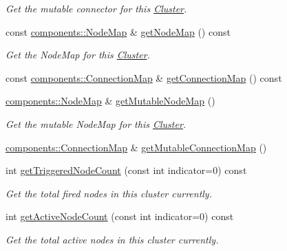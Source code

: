 \begin{DoxyCompactItemize}
\begin{DoxyCompactList}\small\item\em \-Get the mutable connector for this \hyperlink{classcryomesh_1_1structures_1_1Cluster}{\-Cluster}. \end{DoxyCompactList}\item 
const \hyperlink{classcryomesh_1_1components_1_1NodeMap}{components\-::\-Node\-Map} \& \hyperlink{classcryomesh_1_1structures_1_1Cluster_adebc5a93681278631cfb2d70fa579005}{get\-Node\-Map} () const 
\begin{DoxyCompactList}\small\item\em \-Get the \-Node\-Map for this \hyperlink{classcryomesh_1_1structures_1_1Cluster}{\-Cluster}. \end{DoxyCompactList}\item 
const \hyperlink{classcryomesh_1_1components_1_1ConnectionMap}{components\-::\-Connection\-Map} \& \hyperlink{classcryomesh_1_1structures_1_1Cluster_aa6e654c50a4ef23d3fe5c1e22ca15b5d}{get\-Connection\-Map} () const 
\item 
\hyperlink{classcryomesh_1_1components_1_1NodeMap}{components\-::\-Node\-Map} \& \hyperlink{classcryomesh_1_1structures_1_1Cluster_a118bf56f54720d1eb922fe8893a73e78}{get\-Mutable\-Node\-Map} ()
\begin{DoxyCompactList}\small\item\em \-Get the mutable \-Node\-Map for this \hyperlink{classcryomesh_1_1structures_1_1Cluster}{\-Cluster}. \end{DoxyCompactList}\item 
\hyperlink{classcryomesh_1_1components_1_1ConnectionMap}{components\-::\-Connection\-Map} \& \hyperlink{classcryomesh_1_1structures_1_1Cluster_a2e40e205c29f3d68c6f6f1e7389ef2fe}{get\-Mutable\-Connection\-Map} ()
\item 
int \hyperlink{classcryomesh_1_1structures_1_1Cluster_a44131126384d6e5217dc42285f6543be}{get\-Triggered\-Node\-Count} (const int indicator=0) const 
\begin{DoxyCompactList}\small\item\em \-Get the total fired nodes in this cluster currently. \end{DoxyCompactList}\item 
int \hyperlink{classcryomesh_1_1structures_1_1Cluster_a9978dcae127fd87e045ca0b25f338289}{get\-Active\-Node\-Count} (const int indicator=0) const 
\begin{DoxyCompactList}\small\item\em \-Get the total active nodes in this cluster currently. \end{DoxyCompactList}\item 

\end{DoxyCompactItemize}
